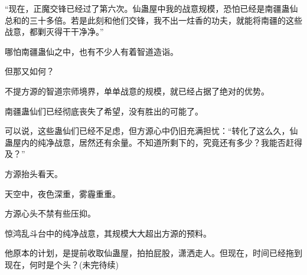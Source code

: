 \begin{this_body}
“现在，正魔交锋已经过了第六次。仙蛊屋中我的战意规模，恐怕已经是南疆蛊仙总和的三十多倍。若是此刻和他们交锋，我不出一炷香的功夫，就能将南疆的这些战意，都剿灭得干干净净。”

哪怕南疆蛊仙之中，也有不少人有着智道造诣。

但那又如何？

不提方源的智道宗师境界，单单战意的规模，就已经占据了绝对的优势。

南疆蛊仙们已经彻底丧失了希望，没有胜出的可能了。

可以说，这些蛊仙们已经不足虑，但方源心中仍旧充满担忧：“转化了这么久，仙蛊屋内的纯净战意，居然还有余量。不知道所剩下的，究竟还有多少？我能否赶得及？”

方源抬头看天。

天空中，夜色深重，雾霾重重。

方源心头不禁有些压抑。

惊鸿乱斗台中的纯净战意，其规模大大超出方源的预料。

他原本的计划，是提前收取仙蛊屋，拍拍屁股，潇洒走人。但现在，时间已经拖到现在，何时是个头？(未完待续)

\end{this_body}


